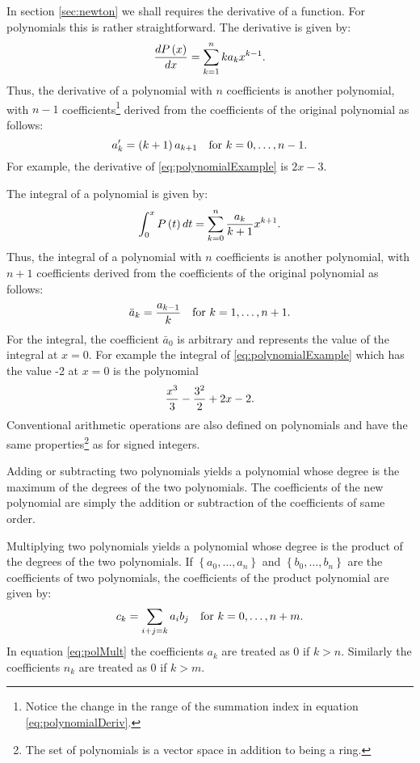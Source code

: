 \documentclass[twoside]{book}
\begin{document}
In section \ref{sec:newton} we shall requires the derivative of a
function. For polynomials this is rather straightforward. The
derivative is given by:
\begin{equation}
\label{eq:polynomialDeriv}{dP\left(x\right)\over
dx}=\sum_{k=1}^{n}k a_k x^{k-1}.
\end{equation}
Thus, the derivative of a polynomial with $n$ coefficients is
another polynomial, with $n-1$ coefficients\footnote{Notice the
change in the range of the summation index in equation
\ref{eq:polynomialDeriv}.} derived from the coefficients of the
original polynomial as follows:
\begin{equation}
a^\prime _k=\left(k+1\right)a_{k+1}\mbox{\quad for
$k=0,\ldots,n-1$}.
\end{equation}
For example, the derivative of \ref{eq:polynomialExample} is
$2x-3$.

The integral of a polynomial is given by:
\begin{equation}
\int_0^xP\left(t\right)dt=\sum_{k=0}^{n}{a_k \over k+1} x^{k+1}.
\end{equation}
Thus, the integral of a polynomial with $n$ coefficients is
another polynomial, with $n+1$  coefficients derived from the
coefficients of the original polynomial as follows:
\begin{equation}
\bar{a}_k={a_{k-1}\over k}\mbox{\quad for $k=1,\ldots,n+1$}.
\end{equation}
For the integral, the coefficient $\bar{a}_0$ is arbitrary and
represents the value of the integral at $x=0$. For example the
integral of \ref{eq:polynomialExample} which has the value -2 at
$x=0$ is the polynomial
\begin{equation}
{x^3\over 3}-{3 ^2\over2}+2x-2.
\end{equation}
Conventional arithmetic operations are also defined on polynomials
and have the same properties\footnote{The set of polynomials is a
vector space in addition to being a ring.} as for signed integers.

Adding or subtracting two polynomials yields a polynomial whose
degree is the maximum of the degrees of the two polynomials. The
coefficients of the new polynomial are simply the addition or
subtraction of the coefficients of same order.

Multiplying two polynomials yields a polynomial whose degree is
the product of the degrees of the two polynomials. If $\left\{
a_0,\ldots,a_n \right\}$ and $\left\{ b_0,\ldots,b_n \right\}$ are
the coefficients of two polynomials, the coefficients of the
product polynomial are given by:
\begin{equation}
\label{eq:polMult} c_k = \sum_{i+j=k}a_i b_j \mbox{\quad for
$k=0,\ldots,n+m$}.
\end{equation}
In equation \ref{eq:polMult} the coefficients $a_k$ are treated as
0 if $k>n$. Similarly the coefficients $n_k$ are treated as 0 if
$k>m$.
\end{document}
